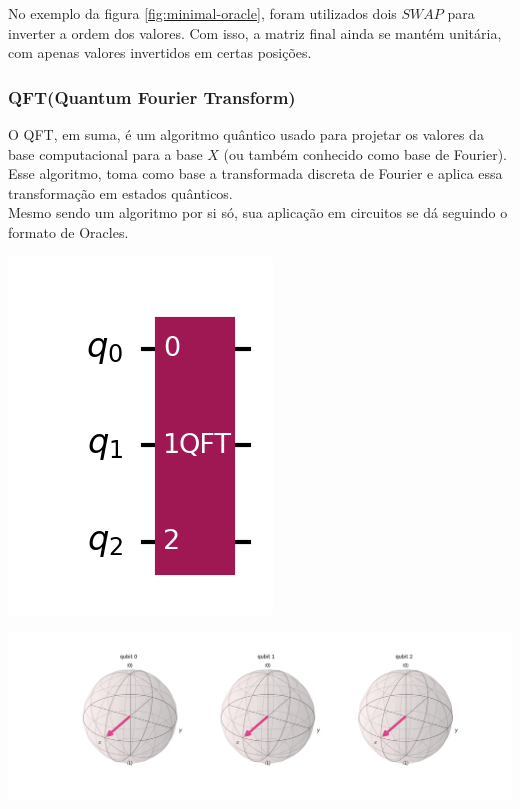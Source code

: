 \documentclass{article}
\begin{document}
No exemplo da figura \ref{fig:minimal-oracle}, foram utilizados dois $SWAP$ para inverter a ordem dos valores. Com isso, a matriz final ainda se mantém unitária, com apenas valores invertidos em certas posições.

\subsubsection{QFT(Quantum Fourier Transform)}
O QFT, em suma, é um algoritmo quântico usado para projetar os valores da base computacional para a base $X$ (ou também conhecido como base de Fourier). Esse algoritmo, toma como base a transformada discreta de Fourier e aplica essa transformação em estados quânticos.\\
Mesmo sendo um algoritmo por si só, sua aplicação em circuitos se dá seguindo o formato de Oracles.

\begin{center}
	\includegraphics[scale=0.3]{QFT_1.png}
	\label{fig:QFT}
\end{center}

\begin{center}
	\includegraphics[scale=0.3]{QFT_1_bloch.png}
	\label{fig:QFT-bloch}
\end{center}
\end{document}
